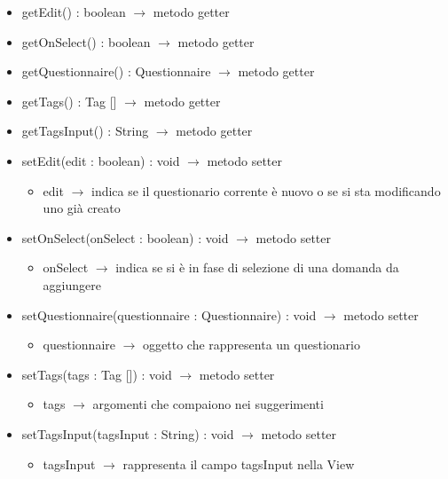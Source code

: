 \begin{description}
\begin{itemize}
	\item getEdit() : boolean $\rightarrow$ metodo getter
	\item getOnSelect() : boolean $\rightarrow$ metodo getter
	\item getQuestionnaire() : Questionnaire $\rightarrow$ metodo getter
	\item getTags() : Tag [] $\rightarrow$ metodo getter
	\item getTagsInput() : String $\rightarrow$ metodo getter
	\item setEdit(edit : boolean) : void $\rightarrow$ metodo setter\begin{itemize}
		\item edit $\rightarrow$ indica se il questionario corrente è nuovo o se si sta modificando uno già creato
	\end{itemize}
	
	\item setOnSelect(onSelect : boolean) : void $\rightarrow$ metodo setter\begin{itemize}
		\item onSelect $\rightarrow$ indica se si è in fase di selezione di una domanda da aggiungere
	\end{itemize}
	
	\item setQuestionnaire(questionnaire : Questionnaire) : void $\rightarrow$ metodo setter\begin{itemize}
		\item questionnaire $\rightarrow$ oggetto che rappresenta un questionario
	\end{itemize}
	
	\item setTags(tags : Tag []) : void $\rightarrow$ metodo setter\begin{itemize}
		\item tags $\rightarrow$ argomenti che compaiono nei suggerimenti
	\end{itemize}
	
	\item setTagsInput(tagsInput : String) : void $\rightarrow$ metodo setter\begin{itemize}
		\item tagsInput $\rightarrow$ rappresenta il campo tagsInput nella View
	\end{itemize}
	
\end{itemize}

\end{description}

